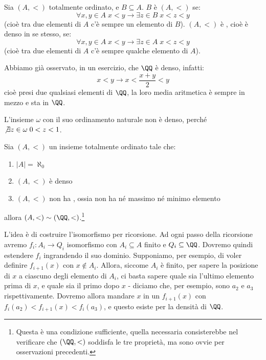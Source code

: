 \documentclass[11pt]{scrartcl}
\begin{document}
\begin{definition}[Densità]
	Sia $(A,<)$ totalmente ordinato, e $B \subseteq A$. $B$ è  $(A,<)$ se:
	\[ \forall x,y \in A \; x < y \rightarrow \exists z \in B \; x < z < y
		\]
	(cioè tra due elementi di $A$ c'è sempre un elemento di $B$). $(A, <)$ è , cioè è denso in se stesso, se:
	\[ \forall x,y \in A \; x < y \rightarrow \exists z \in A \; x < z < y
		\]
		(cioè tra due elementi di $A$ c'è sempre qualche elemento di $A$).
\end{definition}

\begin{example}
	Abbiamo già osservato, in un esercizio, che $\QQ$ è denso, infatti:
	\[ x < y \rightarrow x < \frac{x+y}{2} < y
		\]
	cioè presi due qualsiasi elementi di $\QQ$, la loro media aritmetica è sempre in mezzo e sta in $\QQ$.
\end{example}

\begin{notexample}
	L'insieme $\omega$ con il suo ordinamento naturale non è denso, perché $\not\exists z \in \omega \; 0 < z < 1$.
\end{notexample}

\begin{theorem}
	\label{isoCantor}
	Sia $(A,<)$ un insieme totalmente ordinato tale che:
	\begin{enumerate}[1.]
		\item $|A| = \aleph_0$
		\item $(A,<)$ è denso
		\item $(A,<)$ non ha , ossia non ha né massimo né minimo elemento
	\end{enumerate}
	allora $(A,<)\sim(\QQ,<)$.\footnote{Questa è una condizione sufficiente, quella necessaria consisterebbe nel verificare che $(\QQ,<)$ soddisfa le tre proprietà, ma sono ovvie per osservazioni precedenti.}
\end{theorem}

L'idea è di costruire l'isomorfismo per ricorsione. Ad ogni passo della ricorsione avremo $f_i : A_i \rightarrow Q_i$ isomorfismo con $A_i \subseteq A$ finito 
e $Q_i \subseteq \QQ$. Dovremo quindi estendere $f_i$ ingrandendo il suo dominio.
Supponiamo, per esempio, di voler definire $f_{i+1}(x)$ con $x \not \in A_i$. Allora, siccome $A_i$ è finito, per sapere la posizione di $x$ a ciascuno degli elemento di $A_i$, ci basta sapere quale sia l'ultimo elemento prima di $x$,
e quale sia il primo dopo $x$ - diciamo che, per esempio, sono $a_2$  e $a_3$ rispettivamente. Dovremo allora mandare $x$ in un $f_{i+1}(x)$ con $f_i(a_2) < f_{i+1}(x) < f_i(a_3)$, e questo esiste per la densità di $\QQ$.
\end{document}
